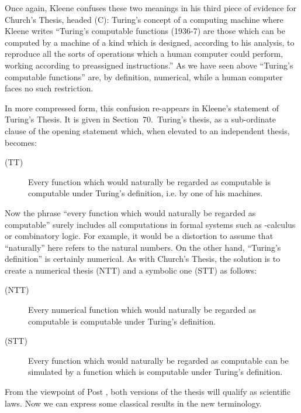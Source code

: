 \documentclass[a4paper]{article}
\begin{document}
Once again, Kleene confuses these two meanings in his third piece of
evidence for Church's Thesis, headed (C): Turing's concept of a
computing machine \cite[page 320]{Kleene52} where Kleene writes
``Turing's computable functions (1936-7) are those which can be
computed by a machine of a kind which is designed, according to his
analysis, to reproduce all the sorts of operations which a human
computer could perform, working according to preassigned
instructions.'' As we have seen above ``Turing's computable
functions'' are, by definition, numerical, while a human computer
faces no such restriction.

In more compressed form, this confusion re-appears in Kleene's
statement of Turing's Thesis. It is given in
Section~70.\ Turing's thesis, as a sub-ordinate clause of the opening
statement which, when elevated to an independent thesis, becomes:



\begin{description}
\item[(TT)]
  Every function which would naturally be regarded as computable is  
  computable under Turing's definition, i.e. by one of   his machines.
\end{description}

\noindent
Now the phrase ``every function which would naturally be regarded as
computable'' surely includes all computations in formal systems such
as -calculus or combinatory logic. For example, it would be a
distortion to assume that ``naturally'' here refers to the natural
numbers. On the other hand, ``Turing's definition'' is certainly numerical. 
As with Church's Thesis, the solution is to create a numerical thesis
(NTT) and a symbolic one (STT) as follows:

\begin{description}
\item[(NTT)]
  Every numerical function which would naturally be regarded as 
   computable is computable under Turing's definition.
\end{description}

\begin{description}
\item[(STT)] Every function which would naturally be regarded as
  computable can be simulated by a function which is computable under
  Turing's definition.
\end{description}

\noindent
From the viewpoint of Post \cite{post}, both versions of the thesis
will qualify as scientific laws. Now we can express some classical
results in the new terminology.
\end{document}
